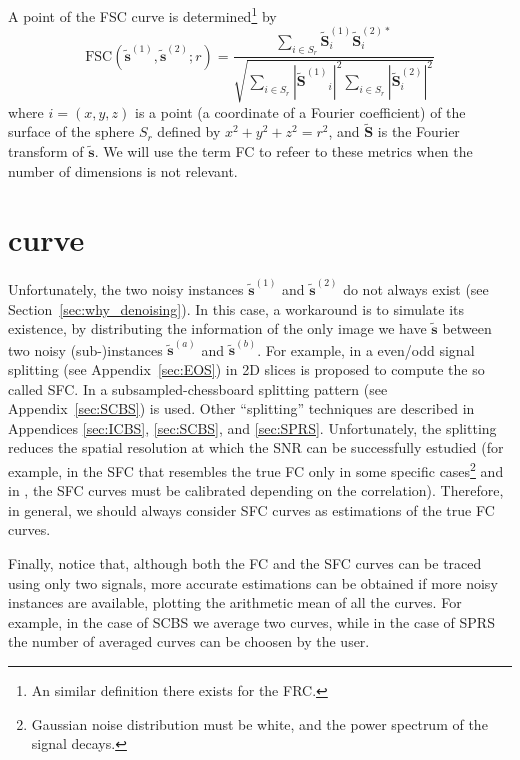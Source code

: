 A point of the FSC curve is determined\footnote{An similar
  definition there exists for the FRC.} by~\cite{verbeke2024self}
\begin{equation}
  \text{FSC}(\tilde{\mathbf{s}}^{(1)}, \tilde{\mathbf{s}}^{(2)}; r) =
  \frac{\sum_{i \in S_r} \tilde{\mathbf{S}}^{(1)}_i \tilde{\mathbf{S}}^{(2)*}_i}
  {\sqrt{\sum_{i \in S_r} |{\tilde{\mathbf{S}}^{(1)}}_i|^2 \sum_{i \in S_r} |{\tilde{\mathbf{S}}^{(2)}_i}|^2}}
  \label{eq:FSC}
\end{equation}
where $i=(x, y, z)$ is a point (a coordinate of a Fourier coefficient)
of the surface of the sphere $S_r$ defined by $x^2+y^2+z^2=r^2$, and
$\tilde{\mathbf{S}}$ is the Fourier transform of $\tilde{\mathbf{s}}$. We
will use the term \gls{FC} to refeer to these metrics when the number
of dimensions is not relevant.


\section{ curve}

Unfortunately, the two noisy instances $\tilde{\mathbf{s}}^{(1)}$ and
$\tilde{\mathbf{s}}^{(2)}$ do not always exist (see
Section~\ref{sec:why_denoising}).  In this case, a workaround is to
simulate its existence, by distributing the information of the only
image we have $\tilde{\mathbf{s}}$ between two noisy
(sub-)instances $\tilde{\mathbf{s}}^{(a)}$ and
$\tilde{\mathbf{s}}^{(b)}$. For example, in \cite{verbeke2024self} a
even/odd signal splitting (see Appendix~\ref{sec:EOS}) in 2D slices is
proposed to compute the so called \gls{SFC}. In \cite{koho2019fourier}
a subsampled-chessboard splitting pattern (see
Appendix~\ref{sec:SCBS}) is used. Other ``splitting'' techniques are
described in Appendices \ref{sec:ICBS}, \ref{sec:SCBS}, and
\ref{sec:SPRS}. Unfortunately, the splitting reduces the spatial
resolution at which the \gls{SNR} can be successfully
estudied (for example, in \cite{verbeke2024self} the \gls{SFC} that
resembles the true \gls{FC} only in some specific cases\footnote{Gaussian
  noise distribution must be white, and the power spectrum of the
  signal decays.} and in \cite{koho2019fourier}, the \gls{SFC} curves
must be calibrated depending on the correlation). Therefore, in
general, we should always consider \gls{SFC} curves as estimations of
the true \gls{FC} curves.

Finally, notice that, although both the \gls{FC} and the \gls{SFC} curves
can be traced using only two signals, more accurate estimations can be
obtained if more noisy instances are available, plotting the arithmetic mean
of all the curves. For example, in the case of \gls{SCBS} we average two
curves, while in the case of \gls{SPRS} the number of averaged curves can be
choosen by the user.

